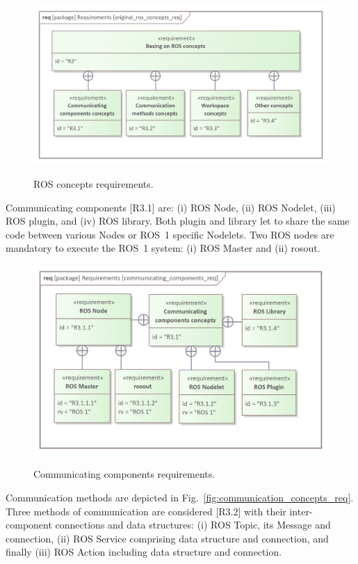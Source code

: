 \begin{figure}[H]
	\centering
	\begin{center}
	{\includegraphics[scale=1.1]{../imgs/requirement_pkg/original_ros_concepts_req.png}}
	\end{center}
	\caption{ROS concepts requirements.}
	\label{fig:ros_concepts_req}
\end{figure}

Communicating components [R3.1] are: (i) ROS Node, (ii) ROS Nodelet, (iii) ROS plugin, and (iv) ROS library. Both plugin and library let to share the same code between various Nodes or ROS~1 specific Nodelets. Two ROS nodes are mandatory to execute the ROS~1 system: (i) ROS Master and (ii) rosout.

\begin{figure}[H]
	\centering
	\begin{center}
	{\includegraphics[scale=1]{../imgs/requirement_pkg/communicating_components_req.png}}
	\end{center}
	\caption{Communicating components requirements.}
	\label{fig:communicating_components_req}
\end{figure}
Communication methods are depicted in Fig.~\ref{fig:communication_concepts_req}.
Three methods of communication are considered [R3.2] with their inter-component connections and data structures: (i) ROS Topic, its Message and connection, (ii) ROS Service comprising data structure and connection, and finally (iii) ROS Action including data structure and connection.

